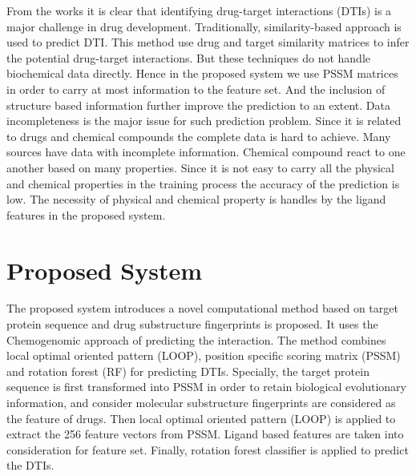 \documentclass[conference]{IEEEtran}
\begin{document}
From the works it is clear that identifying drug-target interactions (DTIs) is a major challenge in drug development. Traditionally, similarity-based approach is used to predict DTI. This method use drug and target similarity matrices to infer the potential drug-target interactions. But these techniques do not handle biochemical data directly. Hence in the proposed system we use PSSM matrices in order to carry at most information to the feature set. And the inclusion of structure based information further improve the prediction to an extent. Data incompleteness is the major issue for such prediction problem. Since it is related to drugs and chemical compounds the complete data is hard to achieve. Many sources have data with incomplete information. Chemical compound react to one another based on many properties. Since it is not easy to carry all the physical and chemical properties in the training process the accuracy of the prediction is low. The necessity of physical and chemical property is handles by the ligand features in the proposed system.

\section{Proposed System}
The proposed system introduces a novel computational method based on target protein sequence and drug substructure fingerprints is proposed. It uses the Chemogenomic approach of predicting the interaction. The method combines local optimal oriented pattern (LOOP), position specific scoring matrix (PSSM) and rotation forest (RF) for predicting DTIs. Specially, the target protein sequence is first transformed into PSSM in order to retain biological evolutionary information, and consider molecular substructure fingerprints are considered as the feature of drugs. Then local optimal oriented pattern (LOOP) is applied to extract the 256 feature vectors from PSSM. Ligand based features are taken into consideration for feature set. Finally, rotation forest classifier is applied to predict the DTIs.
\end{document}
